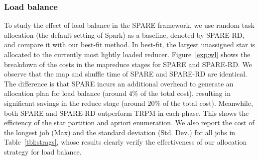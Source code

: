 \subsubsection{Load balance}
To study the effect of load balance in the SPARE framework, we use random task allocation (the default setting of Spark) as a baseline, denoted by SPARE-RD, and compare it with our best-fit method. In best-fit, the largest unassigned star is allocated to the currently most lightly loaded reducer.
Figure~\ref{exp:wl} shows the breakdown of the costs in the mapreduce stages 
for SPARE and SPARE-RD. %
We observe that the map and shuffle time of SPARE and SPARE-RD are identical. The difference is that SPARE incurs an additional overhead to generate an allocation plan for load balance (around $4\%$ of the total cost), resulting in significant savings in the reduce stage (around $20\%$ of the total cost). 
Meanwhile, both SPARE and SPARE-RD outperform TRPM in each phase. This shows the 
efficiency of the star partition and apriori enumeration.
We also report the cost of the longest job (Max) and the standard deviation (Std. Dev.)
for all jobs in Table~\ref{tbl:strags}, whose results clearly verify the effectiveness of our allocation strategy for load balance.



